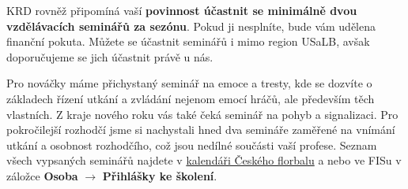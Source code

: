 \documentclass{newsletter_2025}
\begin{document}
KRD rovněž připomíná vaší \textcolor{cfred}{\textbf{povinnost účastnit se minimálně dvou vzdělávacích seminářů za sezónu}}. Pokud ji nesplníte, bude vám udělena finanční pokuta. Můžete se účastnit seminářů i mimo region USaLB, avšak doporučujeme se jich účastnit právě u nás. 

Pro nováčky máme přichystaný seminář na emoce a tresty, kde se dozvíte o základech řízení utkání a zvládání nejenom emocí hráčů, ale především těch vlastních. Z kraje nového roku vás také čeká seminář na pohyb a signalizaci. Pro pokročilejší rozhodčí jsme si nachystali hned dva semináře zaměřené na vnímání utkání a osobnost rozhodčího, což jsou nedílné součásti vaší profese. Seznam všech vypsaných seminářů najdete v \href{https://www.ceskyflorbal.cz/calendar/?filter%5BmanagingAuthority%5D=2&filter%5BcommitteeType%5D=5}{kalendáři Českého florbalu} a nebo ve FISu v záložce \textbf{Osoba} $\to$ \textbf{Přihlášky ke školení}.
\end{document}

